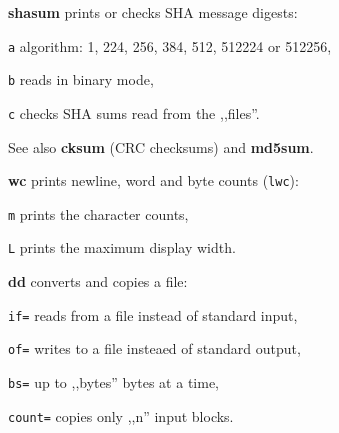 \begin{enumx}
	\item [\cmdblack] \textbf{shasum} prints or checks SHA message digests:
	\item [\texttt{a}] algorithm: 1, 224, 256, 384, 512, 512224 or 512256,
	\item [\texttt{b}] reads in binary mode,
	\item [\texttt{c}] checks SHA sums read from the ,,files''.

	\item [\cmdblack] See also \textbf{cksum} (CRC checksums) and \textbf{md5sum}.
	\item [\cmdblack] \textbf{wc} prints newline, word and byte counts (\texttt{lwc}):
	\item [\texttt{m}] prints the character counts,
	\item [\texttt{L}] prints the maximum display width.
\end{enumx}

\begin{enumx}
	\item [\cmdblack] \textbf{dd} converts and copies a file:
	\item [\texttt{if=}] reads from a file instead of standard input,
	\item [\texttt{of=}] writes to a file insteaed of standard output,
	\item [\texttt{bs=}] up to ,,bytes'' bytes at a time,
	\item [\texttt{count=}] copies only ,,n'' input blocks.
\end{enumx}

